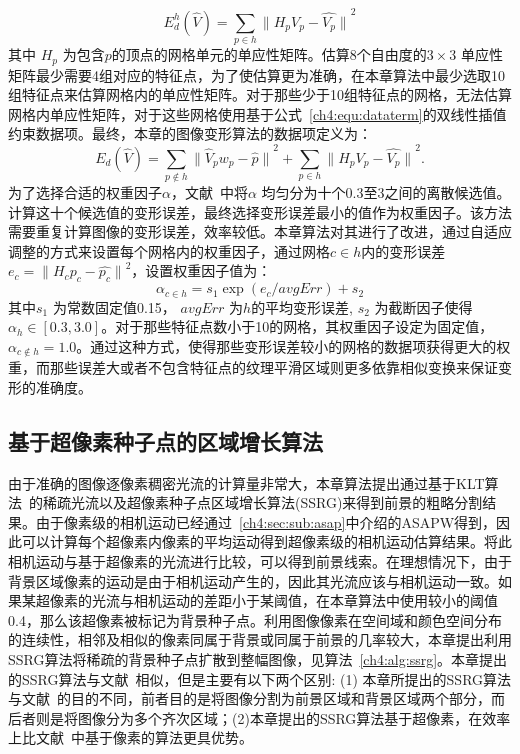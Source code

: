  $$E^{h}_{d}(\hat{V}) = \sum_{p\in h}{\parallel H_{p}V_{p} - \hat{V_{p}}\parallel}^2$$
其中 $H_{p}$ 为包含$p$的顶点的网格单元的单应性矩阵。估算8个自由度的$3\times3$ 单应性矩阵最少需要4组对应的特征点，为了使估算更为准确，在本章算法中最少选取10组特征点来估算网格内的单应性矩阵。对于那些少于10组特征点的网格，无法估算网格内单应性矩阵，对于这些网格使用基于公式~\ref{ch4:equ:dataterm}的双线性插值约束数据项。最终，本章的图像变形算法的数据项定义为：
$${E}_{d}(\hat{V}) = \sum_{p \notin h}{\parallel\hat{V}_{p}{w}_{p}- \hat{p}\parallel}^{2} +
\sum_{p\in h}{\parallel {H_{p}V_{p} - \hat{V_{p}}}\parallel}^2.$$
为了选择合适的权重因子$\alpha$，文献~中将$\alpha$ 均匀分为十个0.3至3之间的离散候选值。计算这十个候选值的变形误差，最终选择变形误差最小的值作为权重因子。该方法需要重复计算图像的变形误差，效率较低。本章算法对其进行了改进，通过自适应调整的方式来设置每个网格内的权重因子，通过网格$c \in h$内的变形误差$e_{c} = {\parallel H_{c}p_{c} - \hat{p_{c}} \parallel}^2 $，设置权重因子值为：
 $$ \alpha_{c\in h} = s_{1}\exp({e_{c}/avgErr})+ s_{2} $$
 其中$s_{1}$ 为常数固定值0.15， $avgErr$ 为$h$的平均变形误差, $s_{2}$ 为截断因子使得 $\alpha_{h} \in [0.3,3.0]$。对于那些特征点数小于10的网格，其权重因子设定为固定值， $\alpha_{c \notin h} = 1.0$。通过这种方式，使得那些变形误差较小的网格的数据项获得更大的权重，而那些误差大或者不包含特征点的纹理平滑区域则更多依靠相似变换来保证变形的准确度。
\subsection{基于超像素种子点的区域增长算法}
\label{ch4:sec:sub:ssrg}
由于准确的图像逐像素稠密光流的计算量非常大，本章算法提出通过基于KLT算法~\cite{KLT}的稀疏光流以及超像素种子点区域增长算法(SSRG)来得到前景的粗略分割结果。由于像素级的相机运动已经通过~\ref{ch4:sec:sub:asap}中介绍的ASAPW得到，因此可以计算每个超像素内像素的平均运动得到超像素级的相机运动估算结果。将此相机运动与基于超像素的光流进行比较，可以得到前景线索。在理想情况下，由于背景区域像素的运动是由于相机运动产生的，因此其光流应该与相机运动一致。如果某超像素的光流与相机运动的差距小于某阈值，在本章算法中使用较小的阈值0.4，那么该超像素被标记为背景种子点。利用图像像素在空间域和颜色空间分布的连续性，相邻及相似的像素同属于背景或同属于前景的几率较大，本章提出利用SSRG算法将稀疏的背景种子点扩散到整幅图像，见算法~\ref{ch4:alg:ssrg}。本章提出的SSRG算法与文献~相似，但是主要有以下两个区别: (1) 本章所提出的SSRG算法与文献~的目的不同，前者目的是将图像分割为前景区域和背景区域两个部分，而后者则是将图像分为多个齐次区域；(2)本章提出的SSRG算法基于超像素，在效率上比文献~中基于像素的算法更具优势。

